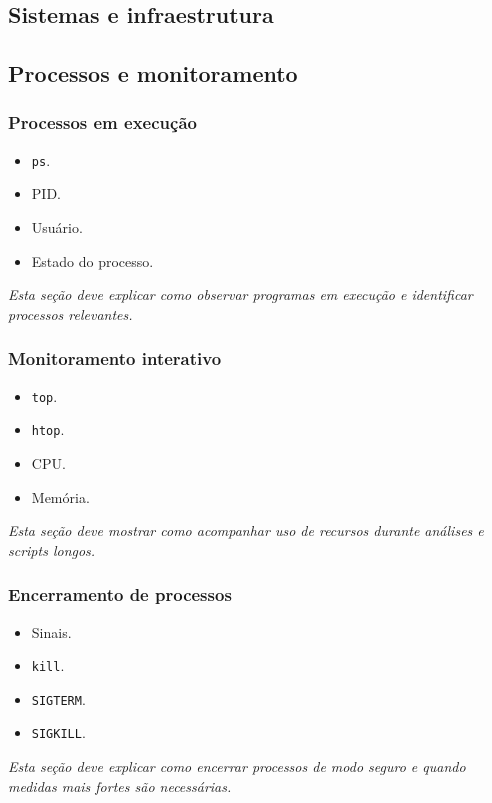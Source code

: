\documentclass[12pt,openany]{book}
\newcommand{\placeholder}[1]{
    \par\medskip
    \noindent\textit{#1}
    \par\medskip
}
\newcommand{\topicos}[1]{
    \begin{itemize}
        #1
    \end{itemize}
}
\begin{document}
\begin{refsection}
\part{Sistemas e infraestrutura}

\chapter{Processos e monitoramento}

\section{Processos em execução}

\topicos{
    \item \texttt{ps}.
    \item PID.
    \item Usuário.
    \item Estado do processo.
}

\placeholder{Esta seção deve explicar como observar programas em execução e identificar processos relevantes.}

\section{Monitoramento interativo}

\topicos{
    \item \texttt{top}.
    \item \texttt{htop}.
    \item CPU.
    \item Memória.
}

\placeholder{Esta seção deve mostrar como acompanhar uso de recursos durante análises e scripts longos.}

\section{Encerramento de processos}

\topicos{
    \item Sinais.
    \item \texttt{kill}.
    \item \texttt{SIGTERM}.
    \item \texttt{SIGKILL}.
}

\placeholder{Esta seção deve explicar como encerrar processos de modo seguro e quando medidas mais fortes são necessárias.}


\end{refsection}
\end{document}
